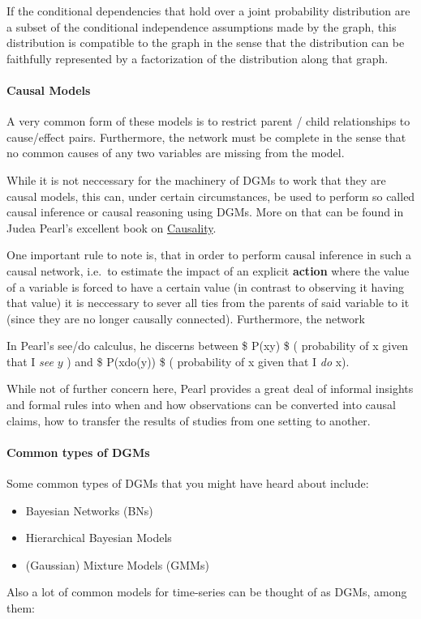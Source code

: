 If the conditional dependencies that hold over a joint probability
distribution are a subset of the conditional independence assumptions
made by the graph, this distribution is compatible to the graph in the
sense that the distribution can be faithfully represented by a
factorization of the distribution along that graph.

\paragraph{Causal Models}

A very common form of these models is to restrict parent / child
relationships to cause/effect pairs. Furthermore, the network must be
complete in the sense that no common causes of any two variables are
missing from the model.

While it is not neccessary for the machinery of DGMs to work that they
are causal models, this can, under certain circumstances, be used to
perform so called causal inference or causal reasoning using DGMs. More
on that can be found in Judea Pearl's excellent book on
\href{http://bayes.cs.ucla.edu\%20/BOOK-2K/}{Causality}.

One important rule to note is, that in order to perform causal inference
in such a causal network, i.e.~to estimate the impact of an explicit
\textbf{action} where the value of a variable is forced to have a
certain value (in contrast to observing it having that value) it is
neccessary to sever all ties from the parents of said variable to it
(since they are no longer causally connected). Furthermore, the network

In Pearl's see/do calculus, he discerns between \$ P(x\textbar{}y) \$ (
probability of x given that I \emph{see} $y$ ) and \$
P(x\textbar{}do(y)) \$ ( probability of x given that I \emph{do} x).

While not of further concern here, Pearl provides a great deal of
informal insights and formal rules into when and how observations can be
converted into causal claims, how to transfer the results of studies
from one setting to another.

\paragraph{Common types of DGMs}

Some common types of DGMs that you might have heard about include:

\begin{itemize}
\item
  Bayesian Networks (BNs)
\item
  Hierarchical Bayesian Models
\item
  (Gaussian) Mixture Models (GMMs)
\end{itemize}
Also a lot of common models for time-series can be thought of as DGMs,
among them:

